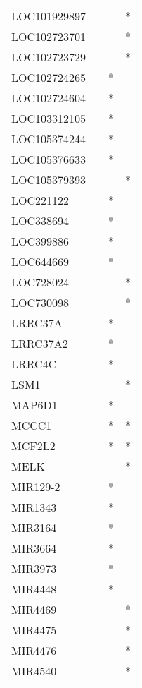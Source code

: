 \begin{longtable}{lccc}
LOC101929897  &       &    &       * \\
LOC102723701  &       &    &       * \\
LOC102723729  &       &    &       * \\
LOC102724265  &       &  * &         \\
LOC102724604  &       &  * &         \\
LOC103312105  &       &  * &         \\
LOC105374244  &       &  * &         \\
LOC105376633  &       &  * &         \\
LOC105379393  &       &    &       * \\
LOC221122     &       &  * &         \\
LOC338694     &       &  * &         \\
LOC399886     &       &  * &         \\
LOC644669     &       &  * &         \\
LOC728024     &       &    &       * \\
LOC730098     &       &    &       * \\
LRRC37A       &       &  * &         \\
LRRC37A2      &       &  * &         \\
LRRC4C        &       &  * &         \\
LSM1          &       &    &       * \\
MAP6D1        &       &  * &         \\
MCCC1         &       &  * &       * \\
MCF2L2        &       &  * &       * \\
MELK          &       &    &       * \\
MIR129-2      &       &  * &         \\
MIR1343       &       &  * &         \\
MIR3164       &       &  * &         \\
MIR3664       &       &  * &         \\
MIR3973       &       &  * &         \\
MIR4448       &       &  * &         \\
MIR4469       &       &    &       * \\
MIR4475       &       &    &       * \\
MIR4476       &       &    &       * \\
MIR4540       &       &    &       * \\

\end{longtable}
